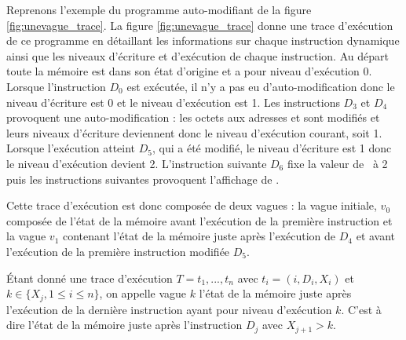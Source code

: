 Reprenons l'exemple du programme auto-modifiant de la figure \ref{fig:unevague_trace}.
La figure \ref{fig:unevague_trace} donne une trace d'exécution de ce programme en détaillant les informations sur chaque instruction dynamique ainsi que les niveaux d'écriture et d'exécution de chaque instruction.
Au départ toute la mémoire est dans son état d'origine et a pour niveau d'exécution 0. Lorsque l'instruction $D_0$ est exécutée, il n'y a pas eu d'auto-modification donc le niveau d'écriture est 0 et le niveau d'exécution est 1.
Les instructions $D_3$ et $D_4$ provoquent une auto-modification : les octets aux adresses  et  sont modifiés et leurs niveaux d'écriture deviennent donc le niveau d'exécution courant, soit 1.
Lorsque l'exécution atteint $D_5$, qui a été modifié, le niveau d'écriture est 1 donc le niveau d'exécution devient 2.
L'instruction suivante $D_6$ fixe la valeur de \edi\ à 2 puis les instructions suivantes provoquent l'affichage de \edi.

Cette trace d'exécution est donc composée de deux vagues : la vague initiale, $v_0$ composée de l'état de la mémoire avant l'exécution de la première instruction et la vague $v_1$ contenant l'état de la mémoire juste après l'exécution de $D_4$ et avant l'exécution de la première instruction modifiée $D_5$.




\begin{defi}
 Étant donné une trace d'exécution $T=t_1, ..., t_n$ avec $t_i=(i, D_i, X_i)$ et $k\in\{X_j, 1\leq i\leq n\}$, on appelle vague $k$ l'état de la mémoire juste après l'exécution de la dernière instruction ayant pour niveau d'exécution $k$.
 C'est à dire l'état de la mémoire juste après l'instruction $D_j$ avec $X_{j+1}>k$.
 \label{def:vagues}
\end{defi}


